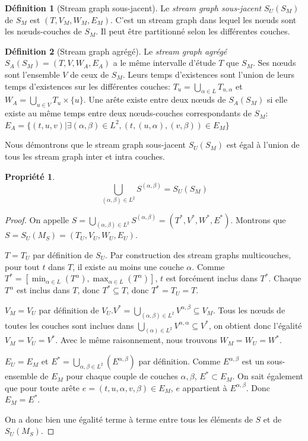 \documentclass[11pt,a4paper]{article}
\newtheorem{prop}{Propriété}
\theoremstyle{definition}
\newtheorem{defn}{Définition}
\theoremstyle{remark}
\theoremstyle{remark}
\def \stg {stream graph}
\def \Stg {Stream graph}
\def \stgms {stream graphs multicouches}
\begin{document}
	

	
	\begin{defn}[\Stg{} sous-jacent]
	Le {\em \stg{} sous-jacent} $S_U(S_M)$ de $S_M$ est $(T,V_M,W_M,E_M)$. C'est un \stg{} dans lequel les n\oe{}uds sont les n\oe{}uds-couches de $S_M$. Il peut être partitionné selon les différentes couches.
	\end{defn}
	
	\begin{defn}[\Stg{} agrégé]
		Le {\em \stg{} agrégé} $S_A(S_M)=(T,V,W_A,E_A)$ a le même intervalle d'étude $T$ que $S_M$. Ses n\oe{}uds sont l'ensemble $V$ de ceux de $S_M$. Leurs temps d'existences sont l'union de leurs temps d'existences sur les différentes couches: $T_u = \bigcup_{\alpha \in L} T_{u,\alpha}$ et $W_A=\bigcup_{u\in V} T_u\times\{u\}$. Une arête existe entre deux n\oe{}uds de $S_A(S_M)$ si elle existe au même temps entre deux n\oe{}uds-couches correspondants de $S_M$: $E_A = \{(t,u,v)| \exists (\alpha,\beta) \in L^2, (t,(u,\alpha),(v,\beta)) \in E_M \}$
	\end{defn}
	
	Nous démontrons que le \stg{} sous-jacent $S_U(S_M)$ est égal à l'union de tous les \stg{} inter et intra couches.
	
		
	\begin{prop}
		\[
			\bigcup_{(\alpha,\beta) \in L^2} S^{(\alpha,\beta)} = S_U(S_M)
		\]
	\end{prop}
	\begin{proof}
	On appelle $S=\bigcup_{(\alpha,\beta) \in L^2} S^{(\alpha,\beta)}=(T^{*},V^{*},W^{*},E^{*})$. Montrons que $S=S_U(M_S)= (T_U,V_U,W_U,E_U)$.
	
	$T=T_U$ par définition de $S_U$. Par construction des \stgms{}, pour tout $t$ dans $T$, il existe au moins une couche $\alpha$. Comme $T^* = [\min_{\alpha \in L} (T^{\alpha}),\max_{\alpha \in L} (T^{\alpha})]$, $t$ est forcément inclus dans $T^*$. Chaque $T^{\alpha}$ est inclus dans $T$, donc $T^* \subseteq T$, donc $T^*=T_U=T$.
	
	$V_M = V_U$ par définition de $V_U$.$V^{*}=\bigcup_{(\alpha,\beta) \in L^2} V^{\alpha,\beta} \subseteq V_M$. Tous les n\oe{}uds de toutes les couches sont inclues dans $\bigcup_{(\alpha) \in L^2} V^{\alpha,\alpha} \subseteq V^{*}$, on obtient donc l'égalité $V_M=V_U=V^*$.
	Avec le même raisonnement, nous trouvons $W_M=W_U=W^*$.
	
	$E_U=E_M$ et $E^{*}=\bigcup_{\alpha,\beta \in L^2}(E^{\alpha,\beta})$ par définition. Comme $E^{\alpha,\beta}$ est un sous-ensemble de $E_M$ pour chaque couple de couches $\alpha,\beta$, $E^{*} \subset E_M$. On sait également que pour toute arête $e =(t,u,\alpha,v,\beta) \in E_M$, $e$ appartient à $E^{\alpha,\beta}$. Donc $E_M=E^{*}$.


On a donc bien une égalité terme à terme entre tous les éléments de $S$ et de $S_U(M_S)$.					
	\end{proof}
\end{document}
